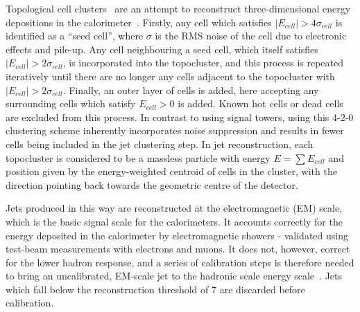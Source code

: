 Topological cell clusters~\cite{ATLAS-LARG-PUB-2008-002} are an attempt to reconstruct three-dimensional energy depositions in the calorimeter~\cite{Cojocaru:2004:ATLASHadronicCalibration,Andrieu:1993:H1PionCalibration}.
Firstly, any cell which satisfies $|E_{cell} | > 4\sigma_{cell}$ is identified as a ``seed cell'', where $\sigma$ is the RMS noise of the cell due to electronic effects and pile-up.
Any cell neighbouring a seed cell, which itself satisfies $|E_{cell}| > 2\sigma_{cell}$, is incorporated into the topocluster, and this process is repeated iteratively until there are no longer any cells adjacent to the topocluster with $|E_{cell}| > 2\sigma_{cell}$.
Finally, an outer layer of cells is added, here accepting any surrounding cells which satisfy $E_{cell} > 0$ is added.
Known hot cells or dead cells are excluded from this process.
In contrast to using signal towers, using this 4-2-0 clustering scheme inherently incorporates noise suppression and results in fewer cells being included in the jet clustering step.
In jet reconstruction, each topocluster is considered to be a massless particle with energy $E = \sum{E_{cell}}$ and position given by the energy-weighted centroid of cells in the cluster, with the direction pointing back towards the geometric centre of the detector.

Jets produced in this way are reconstructed at the electromagnetic (EM) scale, which is the basic signal scale for the \ATLAS calorimeters. It accounts
correctly for the energy deposited in the calorimeter by electromagnetic showers - validated using test-beam measurements with electrons and muons.
It does not, however, correct for the lower hadron response, and a series of calibration steps is therefore needed to bring an uncalibrated, EM-scale jet to the hadronic scale energy scale~\cite{ATLAS-CONF-2010-056,CERN-PH-EP-2011-191}.
Jets which fall below the reconstruction threshold of \unit{7}{\GeV} are discarded before calibration.

